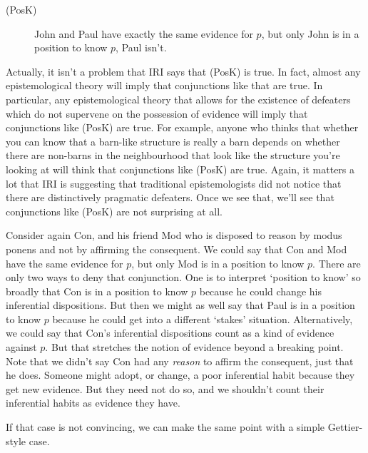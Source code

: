 \documentclass[
  11pt,
  letterpaper,
  DIV=11,
  numbers=noendperiod,
  oneside]{scrartcl}
\begin{document}
\begin{description}
\item[(PosK)]
John and Paul have exactly the same evidence for \(p\), but only John is
in a position to know \(p\), Paul isn't.
\end{description}

Actually, it isn't a problem that IRI says that (PosK) is true. In fact,
almost any epistemological theory will imply that conjunctions like that
are true. In particular, any epistemological theory that allows for the
existence of defeaters which do not supervene on the possession of
evidence will imply that conjunctions like (PosK) are true. For example,
anyone who thinks that whether you can know that a barn-like structure
is really a barn depends on whether there are non-barns in the
neighbourhood that look like the structure you're looking at will think
that conjunctions like (PosK) are true. Again, it matters a lot that IRI
is suggesting that traditional epistemologists did not notice that there
are distinctively pragmatic defeaters. Once we see that, we'll see that
conjunctions like (PosK) are not surprising at all.

Consider again Con, and his friend Mod who is disposed to reason by
modus ponens and not by affirming the consequent. We could say that Con
and Mod have the same evidence for \(p\), but only Mod is in a position
to know \(p\). There are only two ways to deny that conjunction. One is
to interpret `position to know' so broadly that Con is in a position to
know \(p\) because he could change his inferential dispositions. But
then we might as well say that Paul is in a position to know \(p\)
because he could get into a different `stakes' situation. Alternatively,
we could say that Con's inferential dispositions count as a kind of
evidence against \(p\). But that stretches the notion of evidence beyond
a breaking point. Note that we didn't say Con had any \emph{reason} to
affirm the consequent, just that he does. Someone might adopt, or
change, a poor inferential habit because they get new evidence. But they
need not do so, and we shouldn't count their inferential habits as
evidence they have.

If that case is not convincing, we can make the same point with a simple
Gettier-style case.
\end{document}

